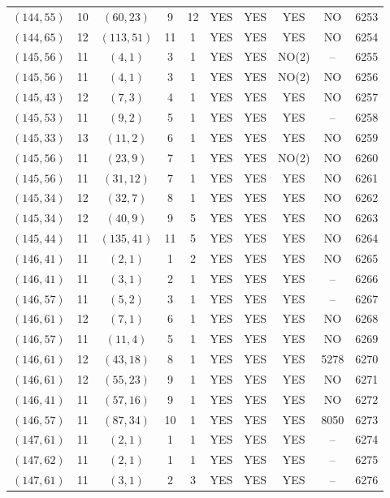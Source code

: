 \begin{longtable}{|c|c|c|c|c|c|c|c|c|c|}
$(144, 55)$ & 10 & $(60, 23)$ & 9 & 12 & YES & YES & YES & NO & 6253\\
$(144, 65)$ & 12 & $(113, 51)$ & 11 & 1 & YES & YES & YES & NO & 6254\\
$(145, 56)$ & 11 & $(4, 1)$ & 3 & 1 & YES & YES & NO(2) & -- & 6255\\
$(145, 56)$ & 11 & $(4, 1)$ & 3 & 1 & YES & YES & NO(2) & NO & 6256\\
$(145, 43)$ & 12 & $(7, 3)$ & 4 & 1 & YES & YES & YES & NO & 6257\\
$(145, 53)$ & 11 & $(9, 2)$ & 5 & 1 & YES & YES & YES & -- & 6258\\
$(145, 33)$ & 13 & $(11, 2)$ & 6 & 1 & YES & YES & YES & NO & 6259\\
$(145, 56)$ & 11 & $(23, 9)$ & 7 & 1 & YES & YES & NO(2) & NO & 6260\\
$(145, 56)$ & 11 & $(31, 12)$ & 7 & 1 & YES & YES & YES & NO & 6261\\
$(145, 34)$ & 12 & $(32, 7)$ & 8 & 1 & YES & YES & YES & NO & 6262\\
$(145, 34)$ & 12 & $(40, 9)$ & 9 & 5 & YES & YES & YES & NO & 6263\\
$(145, 44)$ & 11 & $(135, 41)$ & 11 & 5 & YES & YES & YES & NO & 6264\\
$(146, 41)$ & 11 & $(2, 1)$ & 1 & 2 & YES & YES & YES & NO & 6265\\
$(146, 41)$ & 11 & $(3, 1)$ & 2 & 1 & YES & YES & YES & -- & 6266\\
$(146, 57)$ & 11 & $(5, 2)$ & 3 & 1 & YES & YES & YES & -- & 6267\\
$(146, 61)$ & 12 & $(7, 1)$ & 6 & 1 & YES & YES & YES & NO & 6268\\
$(146, 57)$ & 11 & $(11, 4)$ & 5 & 1 & YES & YES & YES & NO & 6269\\
$(146, 61)$ & 12 & $(43, 18)$ & 8 & 1 & YES & YES & YES & 5278 & 6270\\
$(146, 61)$ & 12 & $(55, 23)$ & 9 & 1 & YES & YES & YES & NO & 6271\\
$(146, 41)$ & 11 & $(57, 16)$ & 9 & 1 & YES & YES & YES & NO & 6272\\
$(146, 57)$ & 11 & $(87, 34)$ & 10 & 1 & YES & YES & YES & 8050 & 6273\\
$(147, 61)$ & 11 & $(2, 1)$ & 1 & 1 & YES & YES & YES & -- & 6274\\
$(147, 62)$ & 11 & $(2, 1)$ & 1 & 1 & YES & YES & YES & -- & 6275\\
$(147, 61)$ & 11 & $(3, 1)$ & 2 & 3 & YES & YES & YES & -- & 6276\\

\end{longtable}
